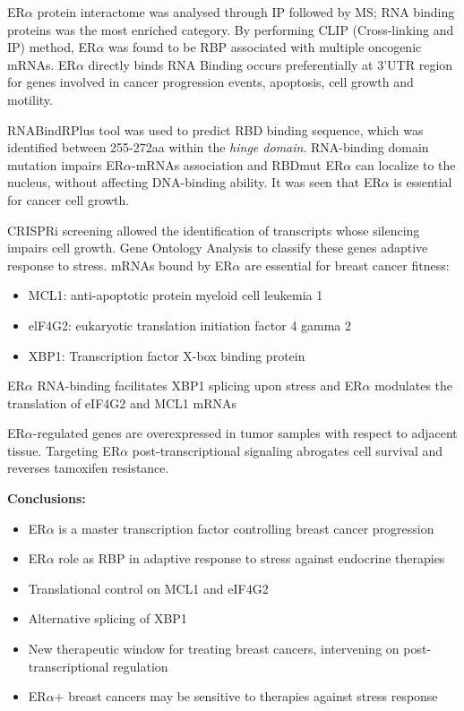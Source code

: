 ER$\alpha$ protein interactome was analysed through IP followed by MS; RNA binding proteins was the most enriched category. By performing CLIP (Cross-linking and IP) method, ER$\alpha$ was found to be RBP associated with multiple oncogenic mRNAs.  ER$\alpha$ directly binds RNA
Binding occurs preferentially at 3’UTR region for genes involved in cancer progression events, apoptosis, cell growth and motility.

RNABindRPlus tool was used to predict RBD binding sequence, which was identified between 255-272aa within the \emph{hinge domain}. RNA-binding domain mutation impairs ER$\alpha$-mRNAs association and RBDmut ER$\alpha$ can localize to the nucleus, without affecting DNA-binding ability. It was seen that ER$\alpha$ is essential for cancer cell growth.

CRISPRi screening allowed the identification of transcripts whose silencing impairs cell growth. Gene Ontology Analysis to classify these genes  adaptive response to stress. 
mRNAs bound by  ER$\alpha$ are essential for breast cancer fitness:
\begin{itemize}
\item MCL1: anti-apoptotic protein myeloid cell leukemia 1
\item elF4G2: eukaryotic translation initiation factor 4 gamma 2
\item XBP1: Transcription factor X-box binding protein
\end{itemize}
ER$\alpha$ RNA-binding facilitates XBP1 splicing upon stress and ER$\alpha$  modulates the translation of eIF4G2 and MCL1 mRNAs


ER$\alpha$-regulated genes are overexpressed in tumor samples with respect to adjacent tissue.
Targeting ER$\alpha$ post-transcriptional signaling abrogates cell survival and reverses tamoxifen resistance.

\textbf{Conclusions:}
\begin{itemize}
\item ER$\alpha$ is a master transcription factor controlling breast cancer progression
\item ER$\alpha$ role as RBP in adaptive response to stress against endocrine therapies 
\item Translational control on MCL1 and eIF4G2
\item Alternative splicing of XBP1
\item New therapeutic window for treating breast cancers, intervening on post-transcriptional regulation
\item ER$\alpha$+ breast cancers may be sensitive to therapies against stress response 
\end{itemize}

